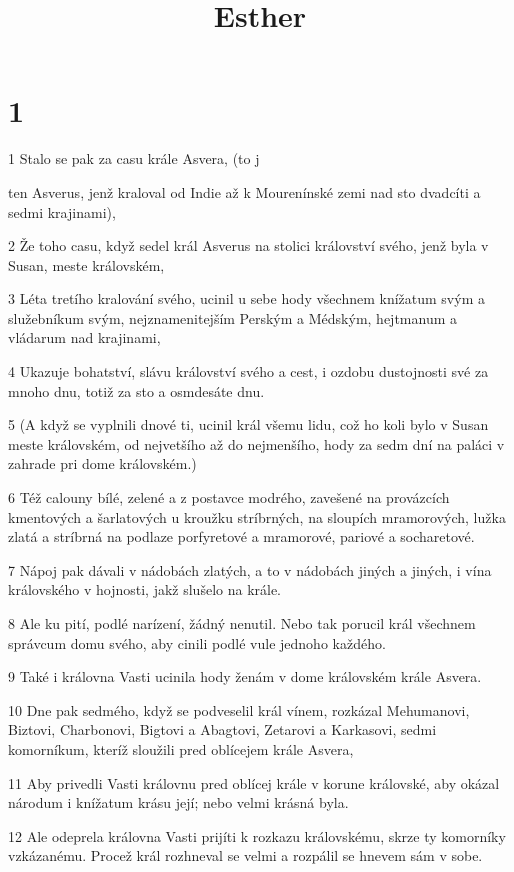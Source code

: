 

\title{Esther}

\chapter{1}

\par 1 Stalo se pak za casu krále Asvera, (to j\par ten Asverus, jenž kraloval od Indie až k Mourenínské zemi nad sto dvadcíti a sedmi krajinami),
\par 2 Že toho casu, když sedel král Asverus na stolici království svého, jenž byla v Susan, meste královském,
\par 3 Léta tretího kralování svého, ucinil u sebe hody všechnem knížatum svým a služebníkum svým, nejznamenitejším Perským a Médským, hejtmanum a vládarum nad krajinami,
\par 4 Ukazuje bohatství, slávu království svého a cest, i ozdobu dustojnosti své za mnoho dnu, totiž za sto a osmdesáte dnu.
\par 5 (A když se vyplnili dnové ti, ucinil král všemu lidu, což ho koli bylo v Susan meste královském, od nejvetšího až do nejmenšího, hody za sedm dní na paláci v zahrade pri dome královském.)
\par 6 Též calouny bílé, zelené a z postavce modrého, zavešené na provázcích kmentových a šarlatových u kroužku stríbrných, na sloupích mramorových, lužka zlatá a stríbrná na podlaze porfyretové a mramorové, pariové a socharetové.
\par 7 Nápoj pak dávali v nádobách zlatých, a to v nádobách jiných a jiných, i vína královského v hojnosti, jakž slušelo na krále.
\par 8 Ale ku pití, podlé narízení, žádný nenutil. Nebo tak porucil král všechnem správcum domu svého, aby cinili podlé vule jednoho každého.
\par 9 Také i královna Vasti ucinila hody ženám v dome královském krále Asvera.
\par 10 Dne pak sedmého, když se podveselil král vínem, rozkázal Mehumanovi, Biztovi, Charbonovi, Bigtovi a Abagtovi, Zetarovi a Karkasovi, sedmi komorníkum, kteríž sloužili pred oblícejem krále Asvera,
\par 11 Aby privedli Vasti královnu pred oblícej krále v korune královské, aby okázal národum i knížatum krásu její; nebo velmi krásná byla.
\par 12 Ale odeprela královna Vasti prijíti k rozkazu královskému, skrze ty komorníky vzkázanému. Procež král rozhneval se velmi a rozpálil se hnevem sám v sobe.
